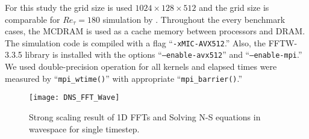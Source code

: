 For this study the grid size is used $1024\times128\times512$ and the grid size is comparable for $Re_\tau = 180$ simulation by \cite{Kim:1987ub}. Throughout the every benchmark cases, the MCDRAM is used as a cache memory between processors and DRAM. The simulation code is compiled with a flag ``{\tt -xMIC-AVX512}.'' Also, the FFTW-3.3.5 library is installed with the options ``{\tt --enable-avx512}'' and ``{\tt --enable-mpi}.'' \cite{Frigo:2005tu} We used double-precision operation for all kernels and elapsed times were measured by ``{\tt mpi\_wtime()}'' with appropriate ``{\tt mpi\_barrier()}.''

\begin{figure}
 \begin{center}
   \texttt{[image: DNS\_FFT\_Wave]}
   \caption{Strong scaling result of 1D FFTs and Solving N-S equations in wavespace for single timestep.}
   \label{fig:DNS_strong_scale_fft_wave}
 \end{center}
\end{figure}

